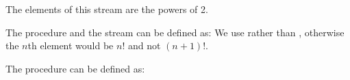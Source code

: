 \begin{exe}[3.53]
    The elements of this stream are the powers of 2.
\end{exe}

\begin{exe}[3.54]
    The procedure  and the stream  can be 
    defined as:
    We use  rather than , otherwise 
    the $n$th element would be $n!$ and not $(n + 1)!$.
\end{exe}

\begin{exe}[3.55]
    The procedure  can be defined as:
\end{exe}
